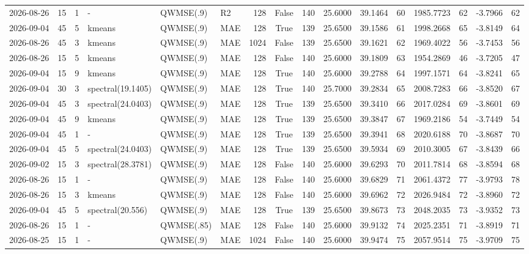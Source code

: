 \documentclass[10pt]{article}
\begin{document}
\begin{landscape}
\begin{longtable}{@{}lrrlllrcrrrrrrrr@{}}
2026-08-26 & 15 & 1 & - & QWMSE(.9) & R2 & 128 & False & 140 & 25.6000 & 39.1464 & 60 & 1985.7723 & 62 & -3.7966 & 62 \\
2026-09-04 & 45 & 5 & kmeans & QWMSE(.9) & MAE & 128 & True & 139 & 25.6500 & 39.1586 & 61 & 1998.2668 & 65 & -3.8149 & 64 \\
2026-08-26 & 45 & 3 & kmeans & QWMSE(.9) & MAE & 1024 & False & 139 & 25.6500 & 39.1621 & 62 & 1969.4022 & 56 & -3.7453 & 56 \\
2026-08-26 & 15 & 5 & kmeans & QWMSE(.9) & MAE & 128 & False & 140 & 25.6000 & 39.1809 & 63 & 1954.2869 & 46 & -3.7205 & 47 \\
2026-09-04 & 15 & 9 & kmeans & QWMSE(.9) & MAE & 128 & True & 140 & 25.6000 & 39.2788 & 64 & 1997.1571 & 64 & -3.8241 & 65 \\
2026-09-04 & 30 & 3 & spectral(19.1405) & QWMSE(.9) & MAE & 128 & True & 140 & 25.7000 & 39.2834 & 65 & 2008.7283 & 66 & -3.8520 & 67 \\
2026-09-04 & 45 & 3 & spectral(24.0403) & QWMSE(.9) & MAE & 128 & True & 139 & 25.6500 & 39.3410 & 66 & 2017.0284 & 69 & -3.8601 & 69 \\
2026-09-04 & 45 & 9 & kmeans & QWMSE(.9) & MAE & 128 & True & 139 & 25.6500 & 39.3847 & 67 & 1969.2186 & 54 & -3.7449 & 54 \\
2026-09-04 & 45 & 1 & - & QWMSE(.9) & MAE & 128 & True & 139 & 25.6500 & 39.3941 & 68 & 2020.6188 & 70 & -3.8687 & 70 \\
2026-09-04 & 45 & 5 & spectral(24.0403) & QWMSE(.9) & MAE & 128 & True & 139 & 25.6500 & 39.5934 & 69 & 2010.3005 & 67 & -3.8439 & 66 \\
2026-09-02 & 15 & 3 & spectral(28.3781) & QWMSE(.9) & MAE & 128 & False & 140 & 25.6000 & 39.6293 & 70 & 2011.7814 & 68 & -3.8594 & 68 \\
2026-08-26 & 15 & 1 & - & QWMSE(.9) & MAE & 128 & False & 140 & 25.6000 & 39.6829 & 71 & 2061.4372 & 77 & -3.9793 & 78 \\
2026-08-26 & 15 & 3 & kmeans & QWMSE(.9) & MAE & 128 & False & 140 & 25.6000 & 39.6962 & 72 & 2026.9484 & 72 & -3.8960 & 72 \\
2026-09-04 & 45 & 5 & spectral(20.556) & QWMSE(.9) & MAE & 128 & True & 139 & 25.6500 & 39.8673 & 73 & 2048.2035 & 73 & -3.9352 & 73 \\
2026-08-26 & 15 & 1 & - & QWMSE(.85) & MAE & 128 & False & 140 & 25.6000 & 39.9132 & 74 & 2025.2351 & 71 & -3.8919 & 71 \\
2026-08-25 & 15 & 1 & - & QWMSE(.9) & MAE & 1024 & False & 140 & 25.6000 & 39.9474 & 75 & 2057.9514 & 75 & -3.9709 & 75 \\

\end{longtable}
\end{landscape}
\end{document}
